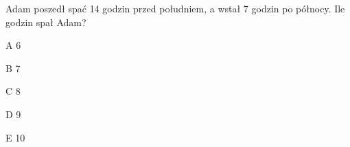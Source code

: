 \begin{tresc}
Adam poszedł spać 14 godzin przed południem, a wstał 7 godzin po północy. Ile godzin spał Adam?
\end{tresc}
\begin{wariant}{A} 6 \end{wariant}
\begin{wariant}{B} 7 \end{wariant}
\begin{wariant}{C} 8 \end{wariant}
\begin{wariant}{D} 9 \end{wariant}
\begin{wariant}{E} 10 \end{wariant}
